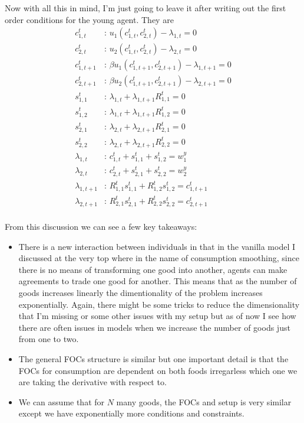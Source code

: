 \documentclass[11pt,english]{article}
\begin{document}
Now with all this in mind, I'm just going to leave it after writing out the first order conditions for the young agent. They are
\begin{align*}
	c_{1,t}^t &:\, u_1(c_{1,t}^t, c_{2,t}^t) - \lambda_{1,t} = 0 \\
	c_{2,t}^t &:\, u_2(c_{1,t}^t, c_{2,t}^t) - \lambda_{2,t}  = 0 \\
	c_{1,t+1}^t &:\, \beta u_1(c_{1,t+1}^t, c_{2,t+1}^t) - \lambda_{1,t+1} = 0 \\
	c_{2,t+1}^t &:\, \beta u_2(c_{1,t+1}^t, c_{2,t+1}^t) - \lambda_{2,t+1} = 0 \\
	s_{1,1}^t &:\,  \lambda_{1,t} + \lambda_{1,t+1}R_{1,1}^t = 0 \\
	s_{1,2}^t &:\,  \lambda_{1,t} + \lambda_{1,t+1}R_{1,2}^t = 0 \\
	s_{2,1}^t &:\,  \lambda_{2,t} + \lambda_{2,t+1}R_{2,1}^t = 0 \\
	s_{2,2}^t &:\,  \lambda_{2,t} + \lambda_{2,t+1}R_{2,2}^t = 0 \\
	\lambda_{1,t} &:\, c_{1,t}^t + s_{1,1}^t + s_{1,2}^t = w_1^y \\
	\lambda_{2,t} &:\, c_{2,t}^t + s_{2,1}^t + s_{2,2}^t = w_2^y \\
	\lambda_{1,t+1} &:\, R_{1,1}^ts_{1,1}^t + R_{1,2}^ts_{1,2}^t = c_{1,t+1}^t  \\
	\lambda_{2,t+1} &:\, R_{2,1}^ts_{2,1}^t + R_{2,2}^ts_{2,2}^t = c_{2,t+1}^t \\
\end{align*}

From this discussion we can see a few key takeaways:
\begin{itemize}
	\item There is a new interaction between individuals in that in the vanilla model I discussed at the very top where in the name of consumption smoothing, since there is no means of transforming one good into another, agents can make agreements to trade one good for another. This means that as the number of goods increases linearly the dimentionality of the problem increases exponentially. Again, there might be some tricks to reduce the dimensionality that I'm missing or some other issues with my setup but as of now I see how there are often issues in models when we increase the number of goods just from one to two. 

	\item The general FOCs structure is similar but one important detail is that the FOCs for consumption are dependent on both foods irregarless which one we are taking the derivative with respect to.

	\item We can assume that for $N$ many goods, the FOCs and setup is very similar except we have exponentially more conditions and constraints.
\end{itemize}
\end{document}
